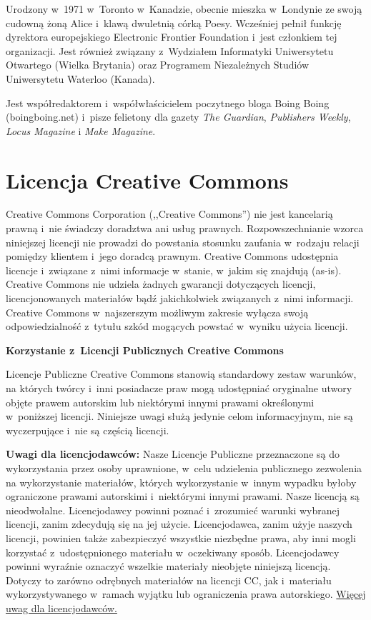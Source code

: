 \documentclass[oneside,polish,11pt,rmheadings]{mwbk}
\begin{document}
Urodzony w~1971 w~Toronto w~Kanadzie, obecnie mieszka w~Londynie ze swoją cudowną żoną Alice i~klawą dwuletnią córką Poesy. Wcześniej pełnił funkcję dyrektora europejskiego Electronic Frontier Foundation i~jest członkiem tej organizacji. Jest również związany z~Wydziałem Informatyki Uniwersytetu Otwartego (Wielka Brytania) oraz Programem Niezależnych Studiów Uniwersytetu Waterloo (Kanada). 


Jest współredaktorem i~współwłaścicielem poczytnego bloga Boing Boing (boingboing.net) i~pisze felietony dla gazety \textit{The Guardian}, \textit{Publishers Weekly}, \textit{Locus Magazine }i \textit{Make Magazine}. 

\chapter*{Licencja Creative Commons}

Creative Commons Corporation (,,Creative Commons'') nie jest kancelarią prawną i~nie świadczy doradztwa ani usług prawnych. Rozpowszechnianie wzorca niniejszej licencji nie prowadzi do powstania stosunku zaufania w~rodzaju relacji pomiędzy klientem i~jego doradcą prawnym. Creative Commons udostępnia licencje i~związane z~nimi informacje w~stanie, w~jakim się znajdują (as-is). Creative Commons nie udziela żadnych gwarancji dotyczących licencji, licencjonowanych materiałów bądź jakichkolwiek związanych z~nimi informacji. Creative Commons w~najszerszym możliwym zakresie wyłącza swoją odpowiedzialność z~tytułu szkód mogących powstać w~wyniku użycia licencji. 

\smallskip

\textbf{Korzystanie z~Licencji Publicznych Creative Commons} 

Licencje Publiczne Creative Commons stanowią standardowy zestaw warunków, na których twórcy i~inni posiadacze praw mogą udostępniać oryginalne utwory objęte prawem autorskim lub niektórymi innymi prawami określonymi w~poniższej licencji. Niniejsze uwagi służą jedynie celom informacyjnym, nie są wyczerpujące i~nie są częścią licencji. 

\textbf{{\textmd{Uwagi dla licencjodawców:}}}{ Nasze Licencje Publiczne przeznaczone są do wykorzystania przez osoby uprawnione, w~celu udzielenia publicznego zezwolenia na wykorzystanie materiałów, których wykorzystanie w~innym wypadku byłoby ograniczone prawami autorskimi i~niektórymi innymi prawami. Nasze licencją są nieodwołalne. Licencjodawcy powinni poznać i~zrozumieć warunki wybranej licencji, zanim zdecydują się na jej użycie. Licencjodawca, zanim użyje naszych licencji, powinien także zabezpieczyć wszystkie niezbędne prawa, aby inni mogli korzystać z~udostępnionego materiału w~oczekiwany sposób. Licencjodawcy powinni wyraźnie }{oznaczyć wszelkie materiały nieobjęte niniejszą licencją. Dotyczy to zarówno odrębnych materiałów na licencji CC, jak i~materiału wykorzystywanego w~ramach wyjątku lub ograniczenia prawa autorskiego. }
\href{https://wiki.creativecommons.org/Considerations_for_licensors_and_licensees#Considerations_for_licensors}{Więcej uwag dla licencjodawców.}
\end{document}
